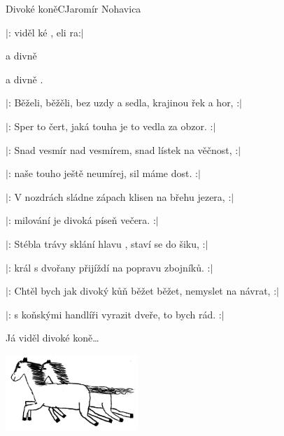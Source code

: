 \begin{song}{Divoké koně}{C}{Jaromír Nohavica}

\begin{SBVerse}

$|$: viděl ké , eli ra:$|$

  a divně  

   a divně  .

\end{SBVerse}

\begin{SBVerse}
$|$: Běželi, běžěli, bez uzdy a sedla, krajinou řek a hor, :$|$

$|$: Sper to čert, jaká touha je to vedla za obzor. :$|$
\end{SBVerse}

\begin{SBVerse}

$|$: Snad vesmír nad vesmírem, snad lístek na věčnost, :$|$

$|$: naše touho ještě neumírej, sil máme dost. :$|$

\end{SBVerse}

\begin{SBVerse}
$|$: V nozdrách sládne zápach klisen na břehu jezera, :$|$

$|$: milování je divoká píseň večera. :$|$
\end{SBVerse}

\begin{SBVerse}
$|$: Stébla trávy sklání hlavu , staví se do šiku, :$|$

$|$: král s dvořany přijíždí na popravu zbojníků. :$|$
\end{SBVerse}

\begin{SBVerse}
$|$: Chtěl bych jak divoký kůň běžet běžet, nemyslet na návrat, :$|$

$|$: s koňskými handlíři vyrazit dveře, to bych rád. :$|$
\end{SBVerse}

\begin{SBVerse}
Já viděl divoké koně\dots
\end{SBVerse}
\begin{center}
\includegraphics[width=5cm]{pict/divoci_kone}
\end{center}
\end{song}
